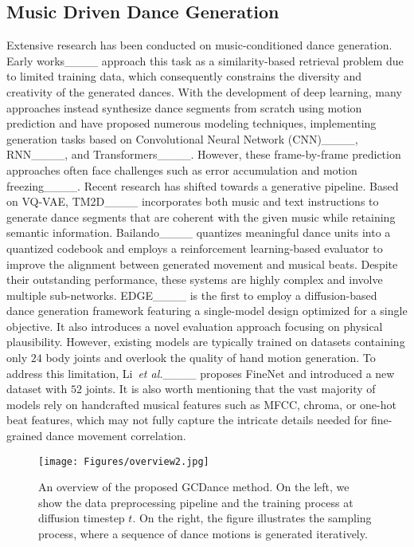 \subsection{Music Driven Dance Generation}
Extensive research has been conducted on music-conditioned dance generation. Early works____ approach this task as a similarity-based retrieval problem due to limited training data, which consequently constrains the diversity and creativity of the generated dances.
With the development of deep learning, many approaches instead synthesize dance segments from scratch using motion prediction and have proposed numerous modeling techniques, implementing generation tasks based on Convolutional Neural Network (CNN)____, RNN____, and Transformers____. However, these frame-by-frame prediction approaches often face challenges such as error accumulation and motion freezing____. Recent research has shifted towards a generative pipeline. Based on VQ-VAE, TM2D____ incorporates both music and text instructions to generate dance segments that are coherent with the given music while retaining semantic information. Bailando____ quantizes meaningful dance units into a quantized codebook and employs a reinforcement learning-based evaluator to improve the alignment between generated movement and musical beats. Despite their outstanding performance, these systems are highly complex and involve multiple sub-networks. EDGE____ is the first to employ a diffusion-based dance generation framework featuring a single-model design optimized for a single objective. It also introduces a novel evaluation approach focusing on physical plausibility. However, existing models are typically trained on datasets containing only $24$ body joints and overlook the quality of hand motion generation. To address this limitation, Li~\textit{et al.}____ proposes FineNet and introduced a new dataset with $52$ joints. It is also worth mentioning that the vast majority of models rely on handcrafted musical features such as MFCC, chroma, or one-hot beat features, which may not fully capture the intricate details needed for fine-grained dance movement correlation.



\begin{figure*}[!t]
  \centering
  \texttt{[image: Figures/overview2.jpg]}
  \caption{An overview of the proposed GCDance method. On the left, we show the data preprocessing pipeline and the training process at diffusion timestep $t$. On the right, the figure illustrates the sampling process, where a sequence of dance motions is generated iteratively.}
  \label{f1}
\end{figure*}

